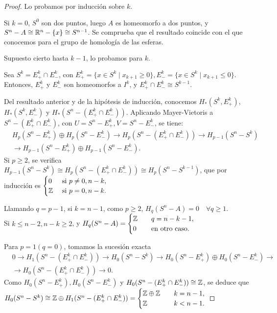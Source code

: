 \begin{proof}
  Lo probamos por inducción sobre $k$.

  Si $k = 0$, $S^0$ son dos puntos, luego $A$ es homeomorfo a dos puntos, y $S^n - A \cong \mathbb{R}^n - \{x\} \cong S^{n-1}$.
  Se comprueba que el resultado coincide con el que conocemos para el grupo de homología de las esferas.

  Supuesto cierto hasta $k - 1$, lo probamos para $k$.

  Sea $S^k = E_+^k \cap E_-^k$, con $E_+^k = \{x \in S^k \mid x_{k+1} \geq 0\}, E_-^k = \{x \in S^k \mid x_{k+1} \leq 0\}$.
  Entonces, $E_+^k$ y $E_-^k$ son homeomorfos a $I^k$, y $E_+^k \cap E_-^k \cong S^{k-1}$.

  Del resultado anterior y de la hipótesis de inducción, conocemos $H_*(S^k, E_+^k)$, $H_*(S^k, E_-^k)$ y $H_*(S^n - (E_+^k \cap E_-^k))$.
  Aplicando Mayer-Vietoris a $S^n - (E_+^k \cap E_-^k)$, con $U = S^n - E_+^k, V = S^n - E_-^k$, se tiene:
  \begin{align*}
    &H_p(S^n - E_+^k) \oplus H_p(S^n - E_-^k) \to H_p(S^n - (E_+^k \cap E_-^k)) \to H_{p-1}(S^n - S^k) \\
    &\to H_{p-1}(S^n - E_+^k) \oplus H_{p-1}(S^n - E_-^k).
  \end{align*}
  Si $p \geq 2$, se verifica $H_{p-1}(S^n - S^k) \cong H_p(S^n - (E_+^k \cap E_-^k)) \cong H_p(S^n - S^{k-1})$,
  que por inducción es $\begin{cases} 0 &\text{ si } p \neq 0, n-k, \\ \mathbb{Z} &\text{ si } p = 0, n-k. \end{cases}$

  Llamando $q = p-1$, si $k = n-1$, como $p \geq 2$, $H_q(S^n - A) = 0 \quad \forall q \geq 1$.\\
  Si $k \leq n-2, n-k \geq 2$, y $H_q(S^n - A) = \begin{cases} \mathbb{Z} &\quad q = n-k-1, \\ 0 &\quad \text{en otro caso.} \end{cases}$

  Para $p = 1 (q = 0)$, tomamos la sucesión exacta
  \begin{align*}
    &0 \to H_1(S^n - (E_+^k \cap E_-^k)) \to H_0(S^n - S^k) \to H_0(S^n - E_+^k) \oplus H_0(S^n - E_-^k) \to \\
    &\to H_0(S^n - (E_+^k \cap E_-^k)) \to 0.
  \end{align*}
  Como $H_0(S^n - E_+^k), H_0(S^n - E_-^k)$ y $H_0(S^n - (E_+^k \cap E_-^k)) \cong \mathbb{Z}$,
  se deduce que $H_0(S^n - S^k) \cong \mathbb{Z} \oplus H_1(S^n - (E_+^k \cap E_-^k)) = \begin{cases} \mathbb{Z} \oplus \mathbb{Z} &\quad k = n-1, \\
                                                                                                    \mathbb{Z} &\quad k < n - 1.  \end{cases} $
\end{proof}

